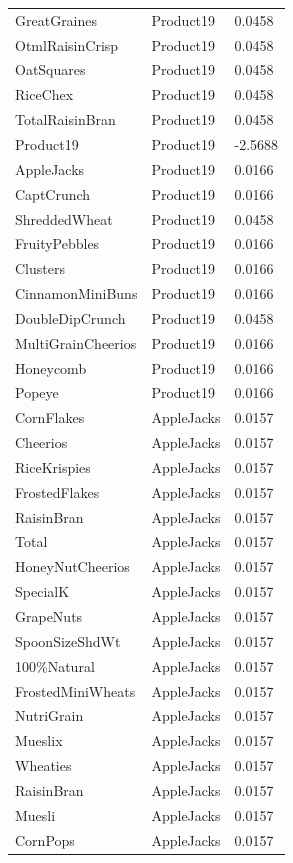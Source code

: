 \begin{table}[!htbp]
\begin{tabular}{lll}
\\
GreatGraines & Product19 & 0.0458
\\
OtmlRaisinCrisp & Product19 & 0.0458
\\
OatSquares & Product19 & 0.0458
\\
RiceChex & Product19 & 0.0458
\\
TotalRaisinBran & Product19 & 0.0458
\\
Product19 & Product19 & -2.5688
\\
AppleJacks & Product19 & 0.0166
\\
CaptCrunch & Product19 & 0.0166
\\
ShreddedWheat & Product19 & 0.0458
\\
FruityPebbles & Product19 & 0.0166
\\
Clusters & Product19 & 0.0166
\\
CinnamonMiniBuns & Product19 & 0.0166
\\
DoubleDipCrunch & Product19 & 0.0458
\\
MultiGrainCheerios & Product19 & 0.0166
\\
Honeycomb & Product19 & 0.0166
\\
Popeye & Product19 & 0.0166
\\
CornFlakes & AppleJacks & 0.0157
\\
Cheerios & AppleJacks & 0.0157
\\
RiceKrispies & AppleJacks & 0.0157
\\
FrostedFlakes & AppleJacks & 0.0157
\\
RaisinBran & AppleJacks & 0.0157
\\
Total & AppleJacks & 0.0157
\\
HoneyNutCheerios & AppleJacks & 0.0157
\\
SpecialK & AppleJacks & 0.0157
\\
GrapeNuts & AppleJacks & 0.0157
\\
SpoonSizeShdWt & AppleJacks & 0.0157
\\
100\%Natural & AppleJacks & 0.0157
\\
FrostedMiniWheats & AppleJacks & 0.0157
\\
NutriGrain & AppleJacks & 0.0157
\\
Mueslix & AppleJacks & 0.0157
\\
Wheaties & AppleJacks & 0.0157
\\
RaisinBran & AppleJacks & 0.0157
\\
Muesli & AppleJacks & 0.0157
\\
CornPops & AppleJacks & 0.0157
\\

\end{tabular}
\end{table}
